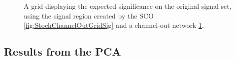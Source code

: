 \begin{figure}[H]
{\begin{subfigure}{.5\textwidth}
        \vspace{-1cm}
        \caption{}
        \label{fig:ChannelOutGridSig}
    \end{subfigure}
    }
    \caption{A grid displaying the expected significance on the original signal set, using the signal region 
    created by the \acs{SCO} \ref{fig:StochChannelOutGridSig} and a channel-out network \ref{fig:ChannelOutGridSig}.}
    \label{fig:SCOCO}
\end{figure}

\subsection{Results from the PCA}\label{appendix:PCA}
\begin{figure}[H]
\end{figure}
